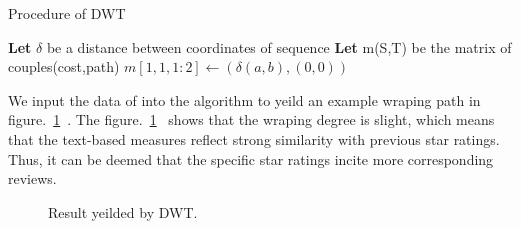 \documentclass[12pt]{article}%
\begin{document}
\begin{algorithm}[H]
	\caption{Procedure of DWT}  
	\LinesNumbered  
	\textbf{Let} $\delta$ be a distance between coordinates of sequence \newline
    \textbf{Let} m(S,T) be the matrix of couples(cost,path)\newline
   $ m[1,1,1:2]\leftarrow(\delta(a,b),(0,0)) $\newline
\end{algorithm} 
We input the data of  into the algorithm to yeild an example wraping path in figure.~\ref{FFFF}~. The figure.~\ref{FFFF}~ shows that the wraping degree is slight, which means that the text-based measures reflect strong similarity with previous star ratings. Thus, it can be deemed that the specific star ratings incite more corresponding reviews.
\begin{figure}[H]
	\centering
	\caption{ Result yeilded by DWT.}
	\label{FFFF}
\end{figure}
\end{document}
